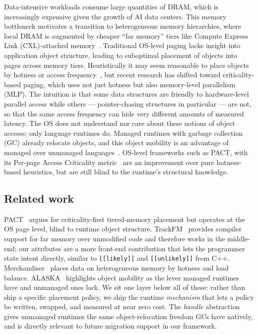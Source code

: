 \documentclass[sigconf]{acmart}
\begin{document}
Data-intensive workloads consume large quantities of DRAM, which is increasingly
expensive given the growth of AI data centers. This memory bottleneck motivates
a transition to heterogeneous memory hierarchies, where local DRAM is augmented
by cheaper ``far memory'' tiers like Compute Express Link
(CXL)-attached memory~\cite{cxl2024}. Traditional OS-level paging lacks insight
into application object structure, leading to suboptimal placement of objects
into pages across memory tiers. Heuristically it may seem reasonable to place
objects by hotness or access frequency~\cite{merchandiser2023}, but recent
research has shifted toward criticality-based paging, which uses not just hotness
but also memory-level parallelism (MLP). The intuition is that some data
structures are friendly to hardware-level parallel access while others ---
pointer-chasing structures in particular --- are not, so that the same access
frequency can hide very different amounts of measured latency. The OS does not understand nor care
about these notions of object accesss; only language runtimes do. Managed runtimes with garbage collection (GC)
already relocate objects, and this object mobility is an advantage of managed over unmanaged languages~\cite{alaska2024}.
OS-level frameworks such as PACT, with its Per-page Access Criticality metric~\cite{pact2026} are an improvement over
pure hotness-based heuristics, but are still blind to the runtime's structural knowledge.

\subsection{Related work}

PACT~\cite{pact2026} argues for criticality-first tiered-memory placement but
operates at the OS page level, blind to runtime object structure.
TrackFM~\cite{trackfm2024} provides compiler support for far memory over
unmodified code and therefore works in the middle-end; our attributes are a
more front-end contribution that lets the programmer state intent directly, similar to \texttt{[[likely]]} and \texttt{[[unlikely]]} from C++.
Merchandiser~\cite{merchandiser2023} places data on heterogeneous memory by
hotness and load balance. ALASKA~\cite{alaska2024} highlights object mobility as
the lever managed runtimes have and unmanaged ones lack. We sit one layer below
all of these: rather than ship a specific placement policy, we ship the runtime
\emph{mechanism} that lets a policy be written, swapped, and measured at near zero cost. The \emph{handle} abstraction~\cite{alaska2024} gives unmanaged runtimes the same object-relocation freedom GCs have natively, and is directly relevant to future migration support in our framework.
\end{document}
